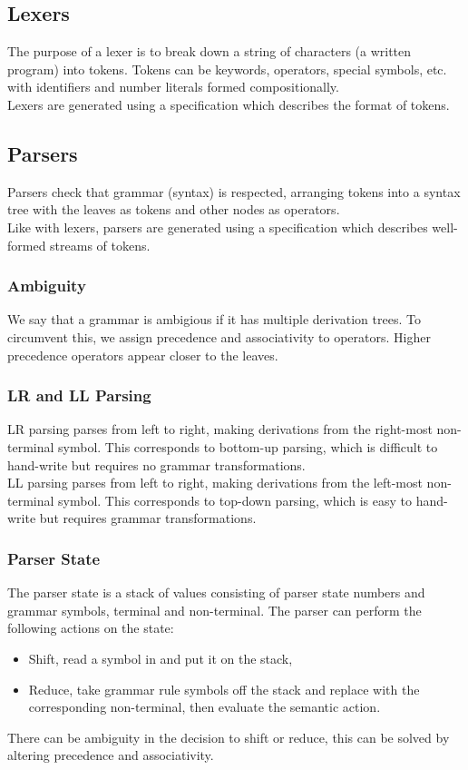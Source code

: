 \subsection{Lexers}

The purpose of a lexer is to break down a string of characters (a written
program) into tokens. Tokens can be keywords, operators, special symbols, etc.
with identifiers and number literals formed compositionally.
\\[\baselineskip]
Lexers are generated using a specification which describes the format of
tokens.

\subsection{Parsers}

Parsers check that grammar (syntax) is respected, arranging tokens into a syntax tree
with the leaves as tokens and other nodes as operators.
\\[\baselineskip]
Like with lexers, parsers are generated using a specification which describes well-formed 
streams of tokens.

\subsubsection{Ambiguity}

We say that a grammar is ambigious if it has multiple derivation trees. To circumvent this,
we assign precedence and associativity to operators. Higher precedence operators appear
closer to the leaves.

\subsubsection{LR and LL Parsing}

LR parsing parses from left to right, making derivations from the right-most non-terminal
symbol. This corresponds to bottom-up parsing, which is difficult to hand-write but requires
no grammar transformations.
\\[\baselineskip]
LL parsing parses from left to right, making derivations from the left-most non-terminal
symbol. This corresponds to top-down parsing, which is easy to hand-write but requires
grammar transformations.

\subsubsection{Parser State}

The parser state is a stack of values consisting of parser state numbers and grammar symbols,
terminal and non-terminal. The parser can perform the following actions on the state:
\begin{itemize}
    \item Shift, read a symbol in and put it on the stack,
    \item Reduce, take grammar rule symbols off the stack and 
        replace with the corresponding non-terminal, then evaluate
        the semantic action.
\end{itemize} There can be ambiguity in the decision to shift or reduce, this can be solved by
altering precedence and associativity.
